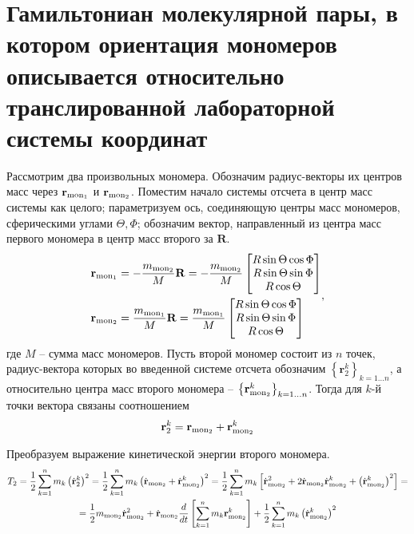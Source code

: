 \documentclass[14pt]{extarticle}
\newcommand{\dvr}{\dot{\mathbf{r}}}
\newcommand{\vr}{\mathbf{r}}
\newcommand{\vR}{\mathbf{R}}
\newcommand{\mmf}{m_{\textup{mon}_1}}
\newcommand{\mms}{m_{\textup{mon}_2}}
\newcommand{\vrmf}{\mathbf{r}_{\textup{mon}_1}}
\newcommand{\vrms}{\mathbf{r}_{\textup{mon}_2}}
\newcommand{\dvrms}{\dot{\mathbf{r}}_{\textup{mon}_2}}
\newcommand{\lb}{\left(}
\newcommand{\rb}{\right)}
\begin{document}
\section*{Гамильтониан молекулярной пары, в котором ориентация мономеров описывается относительно транслированной лабораторной системы координат}

Рассмотрим два произвольных мономера. Обозначим радиус-векторы их центров масс через $\vrmf$ и $\vrms$. Поместим начало системы отсчета в центр масс системы как целого; параметризуем ось, соединяющую центры масс мономеров, сферическими углами $\Theta, \Phi$; обозначим вектор, направленный из центра масс первого мономера в центр масс второго за $\vR$. 
\begin{gather}
	\begin{aligned}
		\vrmf &= - \frac{\mms}{M} \vR = -\frac{\mms}{M} \begin{bmatrix} R \sin \Theta \cos  \Phi \\ R \sin \Theta \sin \Phi \\ R \cos \Theta \end{bmatrix} \\
		\vrms &= \frac{\mmf}{M} \vR = \frac{\mmf}{M} \begin{bmatrix} R \sin \Theta \cos \Phi \\ R \sin \Theta \sin \Phi \\ R \cos \Theta \end{bmatrix}
	\end{aligned},  \label{com_mon}
\end{gather}
где $M$ -- сумма масс мономеров. Пусть второй мономер состоит из $n$ точек, радиус-вектора которых во введенной системе отсчета обозначим $\left\{ \vr_2^k \right\}_{k = 1 \dots n}$, а относительно центра масс второго мономера -- $\left\{ \vrms^k \right\}_{k = 1 \dots n}$. Тогда для $k$-й точки вектора связаны соотношением
\begin{gather}
	\vr_2^k = \vrms + \vrms^k 
\end{gather}

Преобразуем выражение кинетической энергии второго мономера.
\begin{gather}
		T_2 = \frac{1}{2} \sum_{k = 1}^n m_k \lb \dvr_2^k \rb^2 = \frac{1}{2} \sum_{k = 1}^n m_k \lb \dvrms + \dvrms^k \rb^2 = \frac{1}{2} \sum_{k=1}^n m_k \left[ \dvrms^2 + 2 \dvrms \dvrms^k + \lb  \dvrms^k \rb^2 \right] = \notag \\
		= \frac{1}{2} \mms \dvrms^2 + \dvrms \frac{d}{dt} \left[ \sum_{k=1}^n m_k \vrms^k \right] + \frac{1}{2} \sum_{k=1}^n m_k \lb \dvrms^k \rb^2 \label{kin1}
\end{gather}
\end{document}
